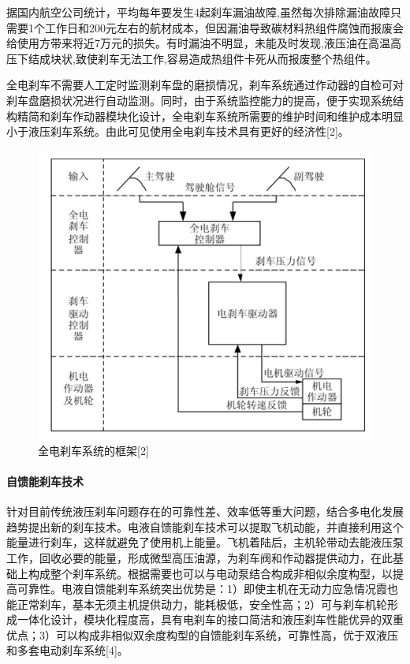 \documentclass[12pt,a4paper]{report}
\begin{document}
据国内航空公司统计，平均每年要发生4起刹车漏油故障,虽然每次排除漏油故障只需要1个工作日和200元左右的航材成本，但因漏油导致碳材料热组件腐蚀而报废会给使用方带来将近7万元的损失。有时漏油不明显，未能及时发现,液压油在高温高压下结成块状,致使刹车无法工作,容易造成热组件卡死从而报废整个热组件。

全电刹车不需要人工定时监测刹车盘的磨损情况，刹车系统通过作动器的自检可对刹车盘磨损状况进行自动监测。同时，由于系统监控能力的提高，便于实现系统结构精简和刹车作动器模块化设计，全电刹车系统所需要的维护时间和维护成本明显小于液压刹车系统。由此可见使用全电刹车技术具有更好的经济性[2]。

\begin{figure}[htp]
\centering
   \includegraphics[width=.8\textwidth]{brakeelectric.jpg}
    \caption{全电刹车系统的框架[2]}
    \label{fig:brakeelectric}
\end{figure}


\paragraph{自馈能刹车技术}

针对目前传统液压刹车问题存在的可靠性差、效率低等重大问题，结合多电化发展趋势提出新的刹车技术。电液自馈能刹车技术可以提取飞机动能，并直接利用这个能量进行刹车，这样就避免了使用机上能量。飞机着陆后，主机轮带动去能液压泵工作，回收必要的能量，形成微型高压油源，为刹车阀和作动器提供动力，在此基础上构成整个刹车系统。根据需要也可以与电动泵结合构成非相似余度构型，以提高可靠性。电液自馈能刹车系统突出优势是：1）即使主机在无动力应急情况霞也能正常刹车，基本无须主机提供动力，能耗极低，安全性高；2）可与刹车机轮形成一体化设计，模块化程度高，具有电刹车的接口简洁和液压刹车性能优异的双重优点；3）可以构成非相似双余度构型的自馈能刹车系统，可靠性高，优于双液压和多套电动刹车系统[4]。
\end{document}

